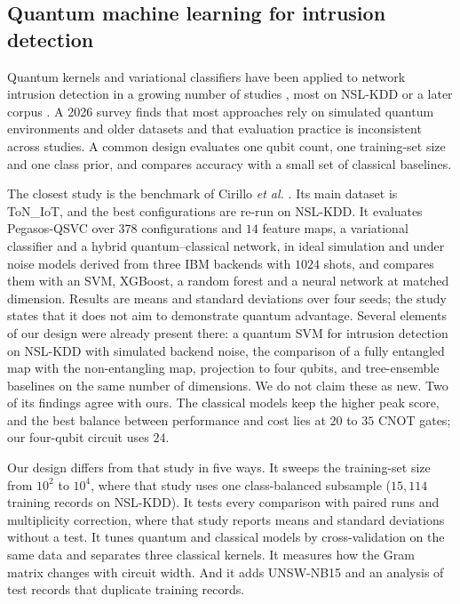 \subsection{Quantum machine learning for intrusion detection}

Quantum kernels and variational classifiers have been applied to network intrusion detection
in a growing number of studies \cite{ref13,ref14,ref15}, most on NSL-KDD \cite{ref4} or a later
corpus \cite{ref25}. A 2026 survey \cite{kaissar2026} finds that most approaches rely on
simulated quantum environments and older datasets and that evaluation practice is inconsistent
across studies. A common design evaluates one qubit count, one training-set size and one class
prior, and compares accuracy with a small set of classical baselines.

The closest study is the benchmark of Cirillo \emph{et al.} \cite{qmi2026}. Its main dataset is
ToN\_IoT, and the best configurations are re-run on NSL-KDD. It evaluates Pegasos-QSVC over
$378$ configurations and $14$ feature maps, a variational classifier and a hybrid
quantum--classical network, in ideal simulation and under noise models derived from three IBM
backends with $1024$ shots, and compares them with an SVM, XGBoost, a random forest and a neural
network at matched dimension. Results are means and standard deviations over four seeds; the
study states that it does not aim to demonstrate quantum advantage. Several elements of our
design were already present there: a quantum SVM for intrusion detection on NSL-KDD with
simulated backend noise, the comparison of a fully entangled \ZZ{} map with the
non-entangling \Zmap{} map, projection to four qubits, and tree-ensemble baselines on the
same number of dimensions. We do not claim these as new. Two of its findings agree with ours.
The classical models keep the higher peak score, and the best balance between performance and
cost lies at $20$ to $35$ CNOT gates; our four-qubit circuit uses $24$.

Our design differs from that study in five ways. It sweeps the training-set size from $10^2$
to $10^4$, where that study uses one class-balanced subsample ($15{,}114$ training records on
NSL-KDD). It tests every comparison with paired runs and multiplicity correction, where that
study reports means and standard deviations without a test. It tunes quantum and classical
models by cross-validation on the same data and separates three classical kernels. It measures how the Gram
matrix changes with circuit width. And it adds UNSW-NB15 and an analysis of test records that
duplicate training records.

